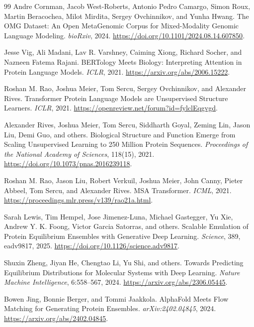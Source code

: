 \documentclass[11pt]{article}
\begin{document}
\begin{thebibliography}{99}
Andre Cornman, Jacob West-Roberts, Antonio Pedro Camargo, Simon Roux, Martin Beracochea, Milot Mirdita, Sergey Ovchinnikov, and Yunha Hwang.
\newblock The OMG Dataset: An Open MetaGenomic Corpus for Mixed-Modality Genomic Language Modeling.
\newblock \emph{bioRxiv}, 2024.
\newblock \url{https://doi.org/10.1101/2024.08.14.607850}.

Jesse Vig, Ali Madani, Lav R. Varshney, Caiming Xiong, Richard Socher, and Nazneen Fatema Rajani.
\newblock BERTology Meets Biology: Interpreting Attention in Protein Language Models.
\newblock \emph{ICLR}, 2021.
\newblock \url{https://arxiv.org/abs/2006.15222}.

Roshan M. Rao, Joshua Meier, Tom Sercu, Sergey Ovchinnikov, and Alexander Rives.
\newblock Transformer Protein Language Models are Unsupervised Structure Learners.
\newblock \emph{ICLR}, 2021.
\newblock \url{https://openreview.net/forum?id=fylclEqgvgd}.

Alexander Rives, Joshua Meier, Tom Sercu, Siddharth Goyal, Zeming Lin, Jason Liu, Demi Guo, and others.
\newblock Biological Structure and Function Emerge from Scaling Unsupervised Learning to 250 Million Protein Sequences.
\newblock \emph{Proceedings of the National Academy of Sciences}, 118(15), 2021.
\newblock \url{https://doi.org/10.1073/pnas.2016239118}.

Roshan M. Rao, Jason Liu, Robert Verkuil, Joshua Meier, John Canny, Pieter Abbeel, Tom Sercu, and Alexander Rives.
\newblock MSA Transformer.
\newblock \emph{ICML}, 2021.
\newblock \url{https://proceedings.mlr.press/v139/rao21a.html}.

Sarah Lewis, Tim Hempel, Jose Jimenez-Luna, Michael Gastegger, Yu Xie, Andrew Y. K. Foong, Victor Garcia Satorras, and others.
\newblock Scalable Emulation of Protein Equilibrium Ensembles with Generative Deep Learning.
\newblock \emph{Science}, 389, eadv9817, 2025.
\newblock \url{https://doi.org/10.1126/science.adv9817}.

Shuxin Zheng, Jiyan He, Chengtao Li, Yu Shi, and others.
\newblock Towards Predicting Equilibrium Distributions for Molecular Systems with Deep Learning.
\newblock \emph{Nature Machine Intelligence}, 6:558--567, 2024.
\newblock \url{https://arxiv.org/abs/2306.05445}.

Bowen Jing, Bonnie Berger, and Tommi Jaakkola.
\newblock AlphaFold Meets Flow Matching for Generating Protein Ensembles.
\newblock \emph{arXiv:2402.04845}, 2024.
\newblock \url{https://arxiv.org/abs/2402.04845}.


\end{thebibliography}
\end{document}
